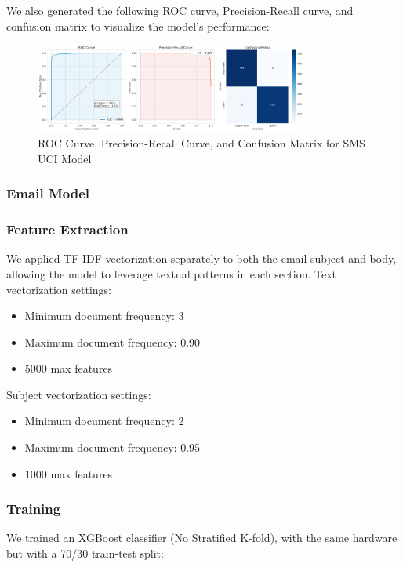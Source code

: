 \documentclass{article}
\begin{document}
\noindent
We also generated the following ROC curve, Precision-Recall curve, and confusion matrix to visualize the model's performance:
\begin{figure}[htbp]
    \centering
    \includegraphics[width=0.8\textwidth]{../analysis/sms/sms_uci_model_performance.png}
    \caption{ROC Curve, Precision-Recall Curve, and Confusion Matrix for SMS UCI Model}
    \label{fig:roc_curve_3}
\end{figure}

\subsubsection{Email Model}
\subsubsection*{Feature Extraction}
We applied TF-IDF vectorization separately to both the email subject and body, allowing the model to leverage textual patterns in each section.
\newline
\newline
Text vectorization settings:
\begin{itemize}
    \item Minimum document frequency: 3
    \item Maximum document frequency: 0.90
    \item 5000 max features
\end{itemize}

\noindent
Subject vectorization settings:
\begin{itemize}
    \item Minimum document frequency: 2
    \item Maximum document frequency: 0.95
    \item 1000 max features
\end{itemize}

\subsubsection*{Training}
We trained an XGBoost classifier (No Stratified K-fold), with the same hardware but with a 70/30 train-test split:
\end{document}
